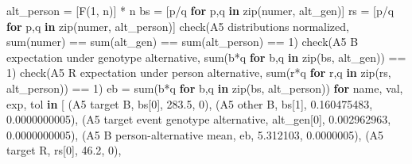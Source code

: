 \documentclass[
]{article}
\newenvironment{Shaded}{}{}
\newcommand{\BuiltInTok}[1]{\textcolor[rgb]{0.00,0.50,0.00}{#1}}
\newcommand{\ControlFlowTok}[1]{\textcolor[rgb]{0.00,0.44,0.13}{\textbf{#1}}}
\newcommand{\DecValTok}[1]{\textcolor[rgb]{0.25,0.63,0.44}{#1}}
\newcommand{\FloatTok}[1]{\textcolor[rgb]{0.25,0.63,0.44}{#1}}
\newcommand{\KeywordTok}[1]{\textcolor[rgb]{0.00,0.44,0.13}{\textbf{#1}}}
\newcommand{\NormalTok}[1]{#1}
\newcommand{\OperatorTok}[1]{\textcolor[rgb]{0.40,0.40,0.40}{#1}}
\newcommand{\StringTok}[1]{\textcolor[rgb]{0.25,0.44,0.63}{#1}}
\begin{document}
\begin{Shaded}
\begin{Highlighting}[]
\NormalTok{    alt\_person }\OperatorTok{=}\NormalTok{ [F(}\DecValTok{1}\NormalTok{, n)] }\OperatorTok{*}\NormalTok{ n}
\NormalTok{    bs }\OperatorTok{=}\NormalTok{ [p}\OperatorTok{/}\NormalTok{q }\ControlFlowTok{for}\NormalTok{ p,q }\KeywordTok{in} \BuiltInTok{zip}\NormalTok{(numer, alt\_gen)]}
\NormalTok{    rs }\OperatorTok{=}\NormalTok{ [p}\OperatorTok{/}\NormalTok{q }\ControlFlowTok{for}\NormalTok{ p,q }\KeywordTok{in} \BuiltInTok{zip}\NormalTok{(numer, alt\_person)]}
\NormalTok{    check(}\StringTok{\textquotesingle{}A5 distributions normalized\textquotesingle{}}\NormalTok{, }\BuiltInTok{sum}\NormalTok{(numer) }\OperatorTok{==} \BuiltInTok{sum}\NormalTok{(alt\_gen) }\OperatorTok{==} \BuiltInTok{sum}\NormalTok{(alt\_person) }\OperatorTok{==} \DecValTok{1}\NormalTok{)}
\NormalTok{    check(}\StringTok{\textquotesingle{}A5 B expectation under genotype alternative\textquotesingle{}}\NormalTok{, }\BuiltInTok{sum}\NormalTok{(b}\OperatorTok{*}\NormalTok{q }\ControlFlowTok{for}\NormalTok{ b,q }\KeywordTok{in} \BuiltInTok{zip}\NormalTok{(bs, alt\_gen)) }\OperatorTok{==} \DecValTok{1}\NormalTok{)}
\NormalTok{    check(}\StringTok{\textquotesingle{}A5 R expectation under person alternative\textquotesingle{}}\NormalTok{, }\BuiltInTok{sum}\NormalTok{(r}\OperatorTok{*}\NormalTok{q }\ControlFlowTok{for}\NormalTok{ r,q }\KeywordTok{in} \BuiltInTok{zip}\NormalTok{(rs, alt\_person)) }\OperatorTok{==} \DecValTok{1}\NormalTok{)}
\NormalTok{    eb }\OperatorTok{=} \BuiltInTok{sum}\NormalTok{(b}\OperatorTok{*}\NormalTok{q }\ControlFlowTok{for}\NormalTok{ b,q }\KeywordTok{in} \BuiltInTok{zip}\NormalTok{(bs, alt\_person))}
    \ControlFlowTok{for}\NormalTok{ name, val, exp, tol }\KeywordTok{in}\NormalTok{ [}
\NormalTok{        (}\StringTok{\textquotesingle{}A5 target B\textquotesingle{}}\NormalTok{, bs[}\DecValTok{0}\NormalTok{], }\FloatTok{283.5}\NormalTok{, }\DecValTok{0}\NormalTok{),}
\NormalTok{        (}\StringTok{\textquotesingle{}A5 other B\textquotesingle{}}\NormalTok{, bs[}\DecValTok{1}\NormalTok{], }\FloatTok{0.160475483}\NormalTok{, }\FloatTok{0.0000000005}\NormalTok{),}
\NormalTok{        (}\StringTok{\textquotesingle{}A5 target event genotype alternative\textquotesingle{}}\NormalTok{, alt\_gen[}\DecValTok{0}\NormalTok{], }\FloatTok{0.002962963}\NormalTok{, }\FloatTok{0.0000000005}\NormalTok{),}
\NormalTok{        (}\StringTok{\textquotesingle{}A5 B person{-}alternative mean\textquotesingle{}}\NormalTok{, eb, }\FloatTok{5.312103}\NormalTok{, }\FloatTok{0.0000005}\NormalTok{),}
\NormalTok{        (}\StringTok{\textquotesingle{}A5 target R\textquotesingle{}}\NormalTok{, rs[}\DecValTok{0}\NormalTok{], }\FloatTok{46.2}\NormalTok{, }\DecValTok{0}\NormalTok{),}

\end{Highlighting}
\end{Shaded}
\end{document}
